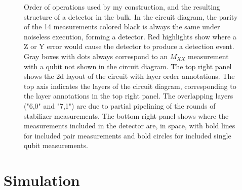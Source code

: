 \documentclass[onecolumn,unpublished,a4paper]{quantumarticle}
\theoremstyle{definition}
\theoremstyle{definition}
\theoremstyle{definition}
\begin{document}
\begin{figure}
    \centering
    \caption{
        Order of operations used by my construction, and the resulting structure of a detector in the bulk.
        In the circuit diagram, the parity of the 14 measurements colored black is always the same under noiseless execution, forming a detector.
        Red highlights show where a Z or Y error would cause the detector to produce a detection event.
        Gray boxes with dots always correspond to an $M_{XX}$ measurement with a qubit not shown in the circuit diagram.
        The top right panel shows the 2d layout of the circuit with layer order annotations.
        The top axis indicates the layers of the circuit diagram, corresponding to the layer annotations in the top right panel.
        The overlapping layers ("6,0" and "7,1") are due to partial pipelining of the rounds of stabilizer measurements.
        The bottom right panel shows where the measurements included in the detector are, in space, with bold lines for included pair measurements and bold circles for included single qubit measurements.
    }
    \label{fig:detector}
\end{figure}

\section{Simulation}
\label{sec:results}
\end{document}
